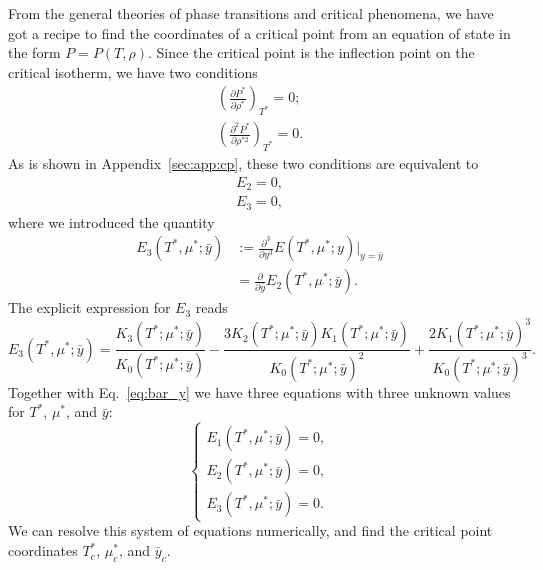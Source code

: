 \documentclass[12pt]{article}
\numberwithin{equation}{section}
\begin{document}
	From the general theories of phase transitions and critical phenomena, we have got a recipe to find the coordinates of a critical point from an equation of state in the form $P=P(T,\rho)$. Since the critical point is the inflection point on the critical isotherm, we have two conditions
	\begin{equation}
		\begin{split}
			\left(\frac{\partial P^*}{\partial \rho^*}\right)_{T^*} = 0;
			\\
			\left(\frac{\partial^2 P^*}{\partial \rho^{*2}}\right)_{T^*} = 0.
		\end{split}		
	\end{equation}
	As is shown in Appendix~\ref{sec:app:cp}, these two conditions are equivalent to
	\begin{equation}
		\label{E2E3eq0}
		\begin{split}
			E_2 = 0,
			\\
			E_3 = 0,
		\end{split}
	\end{equation}
	where we introduced the quantity
	\begin{equation}
		\begin{split}
			E_3(T^*,\mu^*;\bar{y}) &:= \frac{\partial^3}{\partial y^3} E(T^*,\mu^*; y)\big|_{y=\bar{y}} 
			\\
			& = \frac{\partial}{\partial \bar{y}} E_2(T^*,\mu^*; \bar{y}).
		\end{split}
	\end{equation}
	The explicit expression for $E_3$ reads
	\begin{equation}
		E_3(T^*,\mu^*;\bar{y}) = \frac{K_3(T^*;\mu^*;\bar{y})}{K_0(T^*;\mu^*;\bar{y})} - \frac{3 K_2(T^*;\mu^*;\bar{y}) K_1(T^*;\mu^*;\bar{y})}{K_0(T^*;\mu^*;\bar{y})^2} + \frac{2K_1(T^*;\mu^*;\bar{y})^3}{K_0(T^*;\mu^*;\bar{y})^3}.
	\end{equation}
	Together with Eq.~\eqref{eq:bar_y} we have three equations with three unknown values for $T^*$, $\mu^*$, and $\bar{y}$:
	\begin{equation}
		\label{eq:system}
		\begin{cases}
			E_1(T^*,\mu^*; \bar{y}) = 0,\\
			E_2(T^*,\mu^*; \bar{y}) = 0,\\
			E_3(T^*,\mu^*; \bar{y}) = 0.
		\end{cases}
	\end{equation}
	We can resolve this system of equations numerically, and find the critical point coordinates $T^*_c$, $\mu^*_c$, and $\bar{y}_c$.
	
\end{document}
